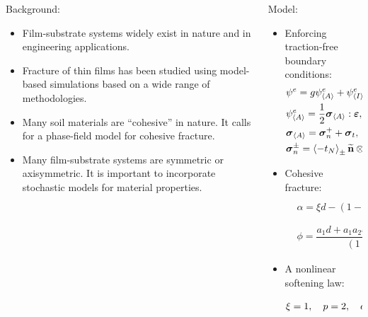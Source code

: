 \begin{frame}
\begin{columns}[T]
\begin{column}{0.5\textwidth}
      Background:
      \begin{itemize}
        \item Film-substrate systems widely exist in nature and in engineering applications.
        \item Fracture of thin films has been studied using model-based simulations based on a wide range of methodologies.
        \item Many soil materials are ``cohesive'' in nature. It calls for a phase-field model for cohesive fracture.
        \item Many film-substrate systems are symmetric or axisymmetric. It is important to incorporate stochastic models for material properties.
      \end{itemize}
    \end{column}
    \pause
    \begin{column}{0.5\textwidth}
      Model:
      \begin{itemize}
        \item Enforcing traction-free boundary conditions:
              \begin{align*}
                 & \psi^e = g\psi^e_{\left< A \right>} + \psi^e_{\left< I \right>} ,                                                                                  \\
                 & \psi^e_{\left< A \right>} = \dfrac{1}{2}\boldsymbol{\sigma}_{\left< A \right>}:\boldsymbol{\varepsilon}, \quad \psi^e_{\left< I \right>} = \dfrac{1}{2}\boldsymbol{\sigma}_{\left< I \right>}:\boldsymbol{\varepsilon} , \\
                 & \boldsymbol{\sigma}_{\left< A \right>} = \boldsymbol{\sigma}_n^+ + \boldsymbol{\sigma}_t, \quad \boldsymbol{\sigma}_{\left< I \right>} = \boldsymbol{\sigma}_n^-,                                              \\
                 & \boldsymbol{\sigma}_n^\pm = \left<-t_N\right>_\pm\widetilde{\textbf{n}}\otimes\widetilde{\textbf{n}}, \quad  \boldsymbol{\sigma}_t = \boldsymbol{\sigma} - \boldsymbol{\sigma}_n^+ - \boldsymbol{\sigma}_n^-.                    
              \end{align*}
        \item Cohesive fracture:
              \begin{align*}
                 & \alpha = \xi d- (1-\xi) d^2, \quad g = \dfrac{1}{1+\phi}, \\
                 & \phi = \dfrac{a_1d + a_1a_2d^2 + a_1a_2a_3d^3}{(1-d)^p}.  
              \end{align*}
        \item A nonlinear softening law:
              \begin{align*}
                \xi = 1, \quad p = 2, \quad a_1 = \dfrac{{\mathcal{G}_c}}{c_0 l \psi_c}, \quad a_2 = 1, \quad a_3 = 0.
              \end{align*}
      \end{itemize}
    \end{column}
  \end{columns}
\end{frame}

